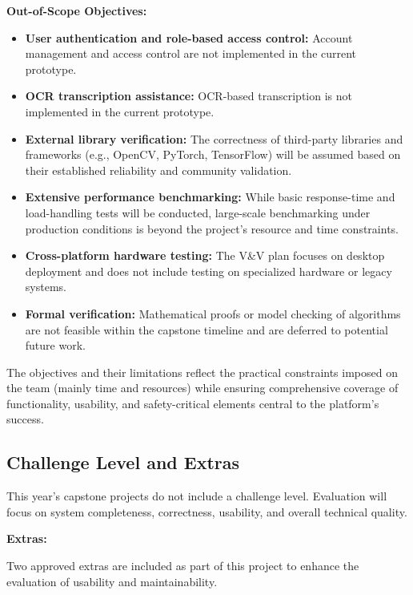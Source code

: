 \documentclass[12pt, titlepage]{article}
\begin{document}
\textbf{Out-of-Scope Objectives:}
\begin{itemize}
    \item \textbf{User authentication and role-based access control:} Account management and access control are not implemented in the current prototype.
    \item \textbf{OCR transcription assistance:} OCR-based transcription is not implemented in the current prototype.
    \item \textbf{External library verification:} The correctness of third-party libraries and frameworks (e.g., OpenCV, PyTorch, TensorFlow) will be assumed based on their established reliability and community validation.
    \item \textbf{Extensive performance benchmarking:} While basic response-time and load-handling tests will be conducted, large-scale benchmarking under production conditions is beyond the project’s resource and time constraints.
    \item \textbf{Cross-platform hardware testing:} The V\&V plan focuses on desktop deployment and does not include testing on specialized hardware or legacy systems.
    \item \textbf{Formal verification:} Mathematical proofs or model checking of algorithms are not feasible within the capstone timeline and are deferred to potential future work.
\end{itemize}

The objectives and their limitations reflect the practical constraints imposed on the team (mainly time and resources) while ensuring comprehensive coverage of functionality, usability, and safety-critical elements central to the platform’s success.


\subsection{Challenge Level and Extras}

This year’s capstone projects do not include a challenge level. Evaluation will focus on system completeness, correctness, usability, and overall technical quality.

\textbf{Extras:}

Two approved extras are included as part of this project to enhance the evaluation of usability and maintainability.
\end{document}
